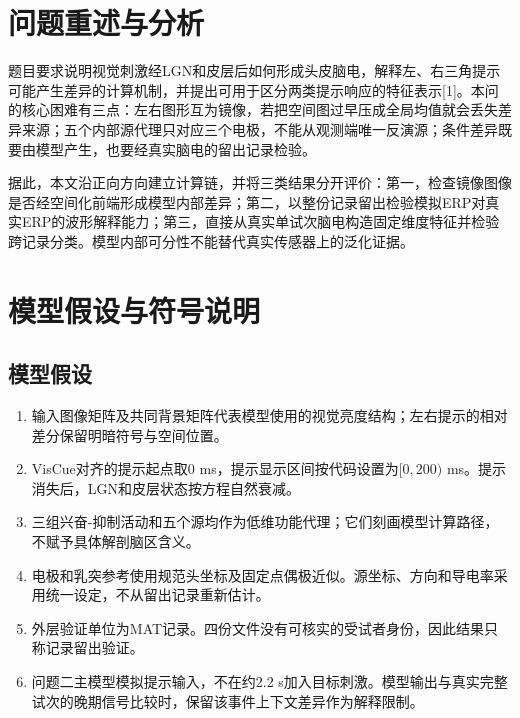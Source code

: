 \hypertarget{ux95eeux9898ux91cdux8ff0ux4e0eux5206ux6790}{%
\section{问题重述与分析}\label{ux95eeux9898ux91cdux8ff0ux4e0eux5206ux6790}}

题目要求说明视觉刺激经LGN和皮层后如何形成头皮脑电，解释左、右三角提示可能产生差异的计算机制，并提出可用于区分两类提示响应的特征表示{[}1{]}。本问的核心困难有三点：左右图形互为镜像，若把空间图过早压成全局均值就会丢失差异来源；五个内部源代理只对应三个电极，不能从观测端唯一反演源；条件差异既要由模型产生，也要经真实脑电的留出记录检验。

据此，本文沿正向方向建立计算链，并将三类结果分开评价：第一，检查镜像图像是否经空间化前端形成模型内部差异；第二，以整份记录留出检验模拟ERP对真实ERP的波形解释能力；第三，直接从真实单试次脑电构造固定维度特征并检验跨记录分类。模型内部可分性不能替代真实传感器上的泛化证据。

\hypertarget{ux6a21ux578bux5047ux8bbeux4e0eux7b26ux53f7ux8bf4ux660e}{%
\section{模型假设与符号说明}\label{ux6a21ux578bux5047ux8bbeux4e0eux7b26ux53f7ux8bf4ux660e}}

\hypertarget{ux6a21ux578bux5047ux8bbe}{%
\subsection{模型假设}\label{ux6a21ux578bux5047ux8bbe}}

\begin{enumerate}
\def\labelenumi{\arabic{enumi}.}
\tightlist
\item
  输入图像矩阵及共同背景矩阵代表模型使用的视觉亮度结构；左右提示的相对差分保留明暗符号与空间位置。
\item
  VisCue对齐的提示起点取0 ms，提示显示区间按代码设置为\([0,200)\) ms。提示消失后，LGN和皮层状态按方程自然衰减。
\item
  三组兴奋-抑制活动和五个源均作为低维功能代理；它们刻画模型计算路径，不赋予具体解剖脑区含义。
\item
  电极和乳突参考使用规范头坐标及固定点偶极近似。源坐标、方向和导电率采用统一设定，不从留出记录重新估计。
\item
  外层验证单位为MAT记录。四份文件没有可核实的受试者身份，因此结果只称记录留出验证。
\item
  问题二主模型模拟提示输入，不在约2.2 s加入目标刺激。模型输出与真实完整试次的晚期信号比较时，保留该事件上下文差异作为解释限制。
\end{enumerate}

